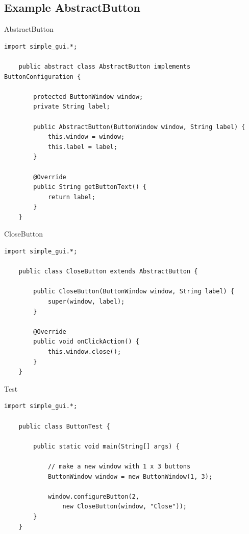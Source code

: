 \subsection{Example AbstractButton}
\begin{frame}[fragile]{AbstractButton}
	\begin{lstlisting}[basicstyle=\ttfamily\scriptsize, escapechar=!]
	import simple_gui.*;

	public abstract class AbstractButton implements ButtonConfiguration {
	
	    protected ButtonWindow window;
	    private String label;
	
	    public AbstractButton(ButtonWindow window, String label) {
	        this.window = window;
	        this.label = label;
	    }

	    @Override
	    public String getButtonText() {
	        return label;
	    }
	}	
	\end{lstlisting}
\end{frame}

\begin{frame}[fragile]{CloseButton}
	\begin{lstlisting}[basicstyle=\ttfamily\scriptsize, escapechar=!]
	import simple_gui.*;
	
	public class CloseButton extends AbstractButton {
	
	    public CloseButton(ButtonWindow window, String label) {
	        super(window, label);
	    }

	    @Override
	    public void onClickAction() {
	        this.window.close();
	    }
	}	
	\end{lstlisting}
\end{frame}

\begin{frame}[fragile]{Test}
	\begin{lstlisting}[basicstyle=\ttfamily\scriptsize]
	import simple_gui.*;

	public class ButtonTest {

	    public static void main(String[] args) {
		
	        // make a new window with 1 x 3 buttons
	        ButtonWindow window = new ButtonWindow(1, 3);
	        
	        window.configureButton(2, 
	            new CloseButton(window, "Close"));
	    }
	}	
	\end{lstlisting}
\end{frame}
